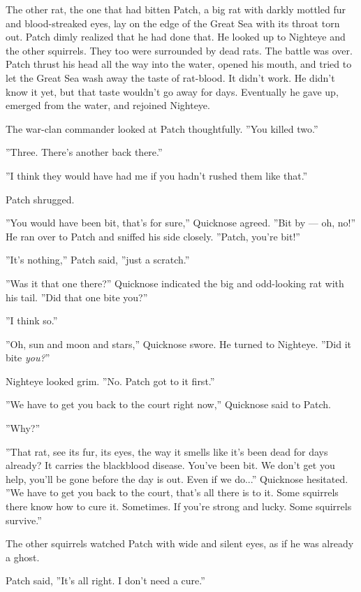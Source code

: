 \documentclass[12pt]{book}
\begin{document}
The other rat, the one that had bitten Patch, a big rat with darkly mottled fur and blood-streaked eyes, lay on the edge of the Great Sea with its throat torn out. Patch dimly realized that he had done that. He looked up to Nighteye and the other squirrels. They too were surrounded by dead rats. The battle was over. Patch thrust his head all the way into the water, opened his mouth, and tried to let the Great Sea wash away the taste of rat-blood. It didn't work. He didn't know it yet, but that taste wouldn't go away for days. Eventually he gave up, emerged from the water, and rejoined Nighteye.

The war-clan commander looked at Patch thoughtfully. ''You killed two.''

''Three. There's another back there.''

''I think they would have had me if you hadn't rushed them like that.''

Patch shrugged.

''You would have been bit, that's for sure,'' Quicknose agreed. ''Bit by ---
oh, no!'' He ran over to Patch and sniffed his side closely. ''Patch, you're bit!''

''It's nothing,'' Patch said, ''just a scratch.''

''Was it that one there?'' Quicknose indicated the big and odd-looking rat with his tail. ''Did that one bite you?''

''I think so.''

''Oh, sun and moon and stars,'' Quicknose swore. He turned to Nighteye. ''Did it bite {\it you?}''

Nighteye looked grim. ''No. Patch got to it first.''

''We have to get you back to the court right now,'' Quicknose said to Patch.

''Why?''

''That rat, see its fur, its eyes, the way it smells like it's been dead for days already? It carries the blackblood disease. You've been bit. We don't get you help, you'll be gone before the day is out. Even if we do...'' Quicknose hesitated. ''We have to get you back to the court, that's all there is to it. Some squirrels there know how to cure it. Sometimes. If you're strong and lucky. Some squirrels survive.''

The other squirrels watched Patch with wide and silent eyes, as if he was already a ghost.

Patch said, ''It's all right. I don't need a cure.''
\end{document}
